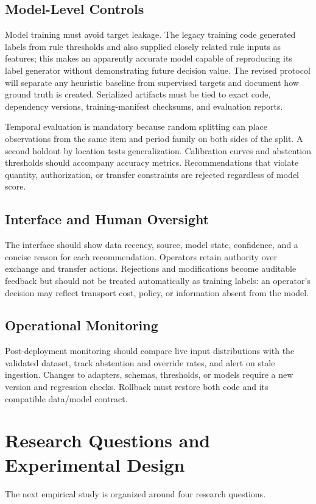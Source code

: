 \documentclass[graybox]{svmult}
\begin{document}
\subsection{Model-Level Controls}
Model training must avoid target leakage. The legacy training code generated labels from rule thresholds and also supplied closely related rule inputs as features; this makes an apparently accurate model capable of reproducing its label generator without demonstrating future decision value. The revised protocol will separate any heuristic baseline from supervised targets and document how ground truth is created. Serialized artifacts must be tied to exact code, dependency versions, training-manifest checksums, and evaluation reports.

Temporal evaluation is mandatory because random splitting can place observations from the same item and period family on both sides of the split. A second holdout by location tests generalization. Calibration curves and abstention thresholds should accompany accuracy metrics. Recommendations that violate quantity, authorization, or transfer constraints are rejected regardless of model score.

\subsection{Interface and Human Oversight}
The interface should show data recency, source, model state, confidence, and a concise reason for each recommendation. Operators retain authority over exchange and transfer actions. Rejections and modifications become auditable feedback but should not be treated automatically as training labels: an operator's decision may reflect transport cost, policy, or information absent from the model.

\subsection{Operational Monitoring}
Post-deployment monitoring should compare live input distributions with the validated dataset, track abstention and override rates, and alert on stale ingestion. Changes to adapters, schemas, thresholds, or models require a new version and regression checks. Rollback must restore both code and its compatible data/model contract.

\section{Research Questions and Experimental Design}
The next empirical study is organized around four research questions.
\end{document}
